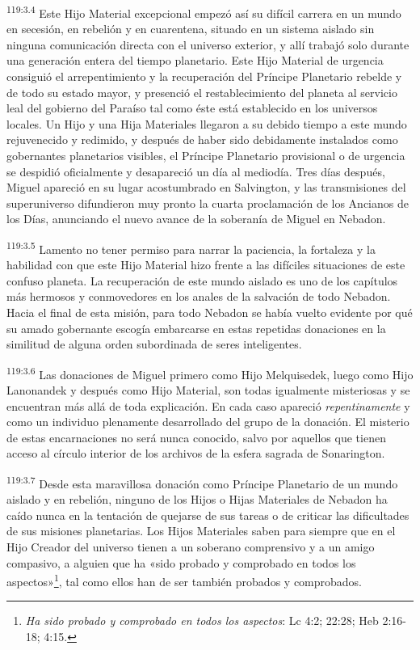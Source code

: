 \par
\textsuperscript{119:3.4} Este Hijo Material excepcional empezó así su difícil carrera en un mundo en secesión, en rebelión y en cuarentena, situado en un sistema aislado sin ninguna comunicación directa con el universo exterior, y allí trabajó solo durante una generación entera del tiempo planetario. Este Hijo Material de urgencia consiguió el arrepentimiento y la recuperación del Príncipe Planetario rebelde y de todo su estado mayor, y presenció el restablecimiento del planeta al servicio leal del gobierno del Paraíso tal como éste está establecido en los universos locales. Un Hijo y una Hija Materiales llegaron a su debido tiempo a este mundo rejuvenecido y redimido, y después de haber sido debidamente instalados como gobernantes planetarios visibles, el Príncipe Planetario provisional o de urgencia se despidió oficialmente y desapareció un día al mediodía. Tres días después, Miguel apareció en su lugar acostumbrado en Salvington, y las transmisiones del superuniverso difundieron muy pronto la cuarta proclamación de los Ancianos de los Días, anunciando el nuevo avance de la soberanía de Miguel en Nebadon.

\par
\textsuperscript{119:3.5} Lamento no tener permiso para narrar la paciencia, la fortaleza y la habilidad con que este Hijo Material hizo frente a las difíciles situaciones de este confuso planeta. La recuperación de este mundo aislado es uno de los capítulos más hermosos y conmovedores en los anales de la salvación de todo Nebadon. Hacia el final de esta misión, para todo Nebadon se había vuelto evidente por qué su amado gobernante escogía embarcarse en estas repetidas donaciones en la similitud de alguna orden subordinada de seres inteligentes.

\par
\textsuperscript{119:3.6} Las donaciones de Miguel primero como Hijo Melquisedek, luego como Hijo Lanonandek y después como Hijo Material, son todas igualmente misteriosas y se encuentran más allá de toda explicación. En cada caso apareció \textit{repentinamente} y como un individuo plenamente desarrollado del grupo de la donación. El misterio de estas encarnaciones no será nunca conocido, salvo por aquellos que tienen acceso al círculo interior de los archivos de la esfera sagrada de Sonarington.

\par
\textsuperscript{119:3.7} Desde esta maravillosa donación como Príncipe Planetario de un mundo aislado y en rebelión, ninguno de los Hijos o Hijas Materiales de Nebadon ha caído nunca en la tentación de quejarse de sus tareas o de criticar las dificultades de sus misiones planetarias. Los Hijos Materiales saben para siempre que en el Hijo Creador del universo tienen a un soberano comprensivo y a un amigo compasivo, a alguien que ha «sido probado y comprobado en todos los aspectos»\footnote{\textit{Ha sido probado y comprobado en todos los aspectos}: Lc 4:2; 22:28; Heb 2:16-18; 4:15.}, tal como ellos han de ser también probados y comprobados.

